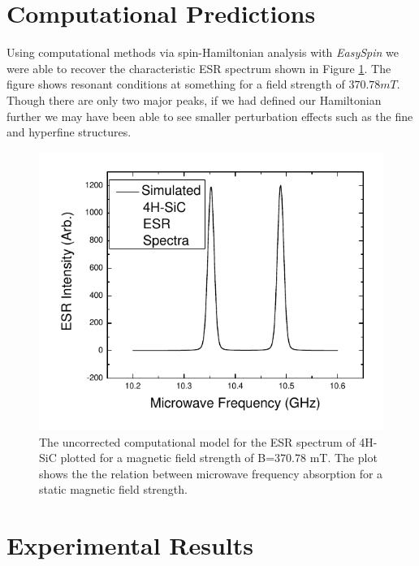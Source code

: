 \documentclass[oneside, noacknowlegments]{BYUPhys}
\begin{document}
\section{Computational Predictions}

Using computational methods via spin-Hamiltonian analysis with \textit{EasySpin} we were able to recover the characteristic ESR spectrum shown in Figure \ref{fig:SiCModel}. The figure shows resonant conditions at something for a field strength of $370.78 mT$. Though there are only two major peaks, if we had defined our Hamiltonian further we may have been able to see smaller perturbation effects such as the fine and hyperfine structures.

\begin{figure}
    \centerline{\includegraphics{p14-esr-uncorrected}}
    \caption[ESR Computational Model for SiC]{\label{fig:SiCModel}
     The uncorrected computational model for the ESR spectrum of 4H-SiC plotted for a magnetic field strength of B=370.78 mT. The plot shows the the relation between microwave frequency absorption for a static magnetic field strength.}
 \end{figure}

\section{Experimental Results}
\end{document}
